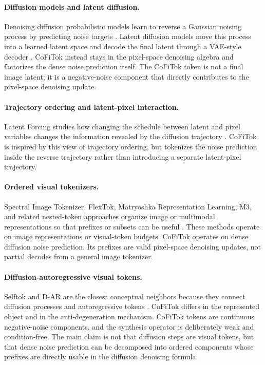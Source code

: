 \documentclass[11pt]{article}
\newcommand{\method}{CoFiTok}
\begin{document}
\paragraph{Diffusion models and latent diffusion.}
Denoising diffusion probabilistic models learn to reverse a Gaussian noising
process by predicting noise targets \citep{ho2020denoising}. Latent diffusion
models move this process into a learned latent space and decode the final latent
through a VAE-style decoder \citep{rombach2022latentdiffusion}. \method{}
instead stays in the pixel-space denoising algebra and factorizes the dense
noise prediction itself. The \method{} token is not a final image latent; it is a
negative-noise component that directly contributes to the pixel-space
denoising update.

\paragraph{Trajectory ordering and latent-pixel interaction.}
Latent Forcing studies how changing the schedule between latent and pixel
variables changes the information revealed by the diffusion trajectory
\citep{baade2026latentforcing}. \method{} is inspired by this view of trajectory
ordering, but tokenizes the noise prediction inside the reverse trajectory
rather than introducing a separate latent-pixel trajectory.

\paragraph{Ordered visual tokenizers.}
Spectral Image Tokenizer, FlexTok, Matryoshka Representation Learning, M3, and
related nested-token approaches organize image or multimodal representations so
that prefixes or subsets can be useful
\citep{esteves2025spectral,bachmann2025flextok,kusupati2024matryoshka,cai2024matryoshkamultimodal}.
These methods operate on image representations or visual-token budgets.
\method{} operates on dense diffusion noise prediction. Its prefixes are valid
pixel-space denoising updates, not partial decodes from a general image
tokenizer.

\paragraph{Diffusion-autoregressive visual tokens.}
Selftok and D-AR are the closest conceptual neighbors because they connect
diffusion processes and autoregressive tokens \citep{wang2025selftok,gao2025dar}.
\method{} differs in the represented object and in the anti-degeneration
mechanism. \method{} tokens are continuous negative-noise components,
and the synthesis operator is deliberately weak and condition-free. The main
claim is not that diffusion steps are visual tokens, but that dense noise
prediction can be decomposed into ordered components whose prefixes are directly
usable in the diffusion denoising formula.
\end{document}
